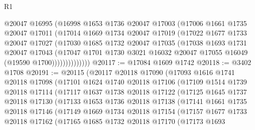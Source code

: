 \begin{lexlean}{R1}
\begin{coremodule}
                @20047
                @16995
                (@16998
                  @1653
                  @1736
                  @20047
                  @17003
                  (@17006
                    @1661
                    @1735
                    @20047
                    @17011
                    (@17014
                      @1669
                      @1734
                      @20047
                      @17019
                      (@17022
                        @1677
                        @1733
                        @20047
                        @17027
                        (@17030
                          @1685
                          @1732
                          @20047
                          @17035
                          (@17038
                            @1693
                            @1731
                            @20047
                            @17043
                            (@17047
                              @1701
                              @1730
                              @3021
                              @16032
                              @20047
                              @17055
                              @16049
                              (@19590 @1700))))))))))))))
@20117 := @17084 @1609 @1742
@20118 := @3402 @1708
@20191 := @20115
    (@20117
      @20118
      @17090
      (@17093
        @1616
        @1741
        @20118
        @17098
        (@17101
          @1624
          @1740
          @20118
          @17106
          (@17109
            @1514
            @1739
            @20118
            @17114
            (@17117
              @1637
              @1738
              @20118
              @17122
              (@17125
                @1645
                @1737
                @20118
                @17130
                (@17133
                  @1653
                  @1736
                  @20118
                  @17138
                  (@17141
                    @1661
                    @1735
                    @20118
                    @17146
                    (@17149
                      @1669
                      @1734
                      @20118
                      @17154
                      (@17157
                        @1677
                        @1733
                        @20118
                        @17162
                        (@17165
                          @1685
                          @1732
                          @20118
                          @17170
                          (@17173
                            @1693

\end{coremodule}
\end{lexlean}
